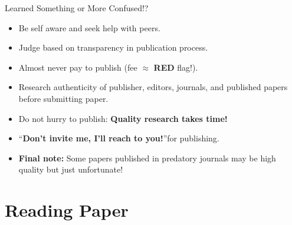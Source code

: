 \documentclass[11pt]{beamer}
\begin{document}
\begin{frame}{Learned Something or More Confused!?}
	\begin{itemize}
	\item Be self aware and seek help with peers.
	\item Judge based on transparency in publication process.
    \item Almost never pay to publish (fee $\approx$ {\color{red}\textbf{RED}} flag!).
    \item Research authenticity of publisher, editors, journals, and published papers before submitting paper.
	\item Do not hurry to publish: {\color{brown}\textbf{Quality research takes time!}}
    \item \textquotedblleft \textbf{Don't invite me, I'll reach to you!}\textquotedblright for publishing.
    \item \textbf{Final note:} Some papers published in predatory journals may be high quality but just unfortunate!
	\end{itemize}
\end{frame}

\section{Reading Paper}
\end{document}
